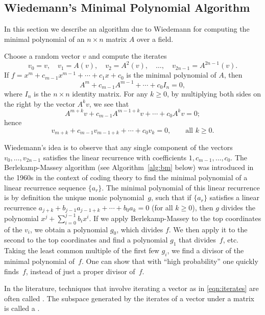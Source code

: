 \subsection{Wiedemann's Minimal Polynomial Algorithm}
\label{sec:wiedemann}
In this section we describe 
an algorithm due to Wiedemann for computing the
minimal polynomial of an $n\times n$ matrix $A$ over a field. 

Choose a random vector $v$ and compute the iterates
\begin{equation}\label{eqn:iterates}
   v_0=v, \quad v_1 = A(v),\quad v_2 = A^2(v),\quad \ldots, \quad v_{2n-1} = A^{2n-1}(v).
\end{equation}
If $f=x^m + c_{m-1}x^{m-1} + \cdots + c_1 x + c_0 $ 
is the minimal polynomial of $A$, then 
$$
   A^m + c_{m-1} A^{m-1} + \cdots + c_0 I_n = 0,
$$
where $I_n$ is the $n\times n$ identity matrix. 
For any $k\geq 0$, by
multiplying both sides on the right by the vector $A^kv$, we see that
$$
   A^{m+k} v + c_{m-1} A^{m-1+k}v + \cdots + c_0 A^k v = 0;
$$
hence
$$
   v_{m+k} + c_{m-1} v_{m-1+k} + \cdots + c_0 v_k = 0, \qquad \text{all $k\geq 0$}.
$$

Wiedemann's idea is to observe that any single component of the
vectors $v_0, \ldots, v_{2n-1}$ satisfies the linear recurrence with
coefficients $1, c_{m-1}, \ldots, c_0$.  The Berlekamp-Massey
algorithm (see Algorithm~\ref{alg:bm} below) was introduced in the
1960s in the context of coding theory to find the minimal polynomial
of a linear recurrence sequence $\{a_r\}$.  The minimal polynomial of
this linear recurrence is by definition the unique monic
polynomial~$g$, such that if $\{a_r\}$ satisfies a linear recurrence
$a_{j+k} + b_{j-1} a_{j-1+k} + \cdots + b_0 a_k=0$ (for all $k\geq
0$), then $g$ divides the polynomial $x^j + \sum_{i=0}^{j-1} b_i x^i$.
If we apply Berlekamp-Massey to the top coordinates of the $v_i$, we
obtain a polynomial $g_0$, which divides $f$.  We then apply it to the
second to the top coordinates and find a polynomial $g_1$ that 
divides~$f$, etc. Taking the least common multiple of the first few $g_i$, we
find a divisor of the minimal polynomial of~$f$.  One can show that
with ``high probability'' one quickly finds~$f$, instead of just a
proper divisor of~$f$.

\begin{remark}\label{rem:krylov}
In the literature, techniques that involve iterating a vector 
as in \eqref{eqn:iterates} are 
often called .  The subspace generated by the iterates
of a vector under a matrix is called a .
\end{remark}



